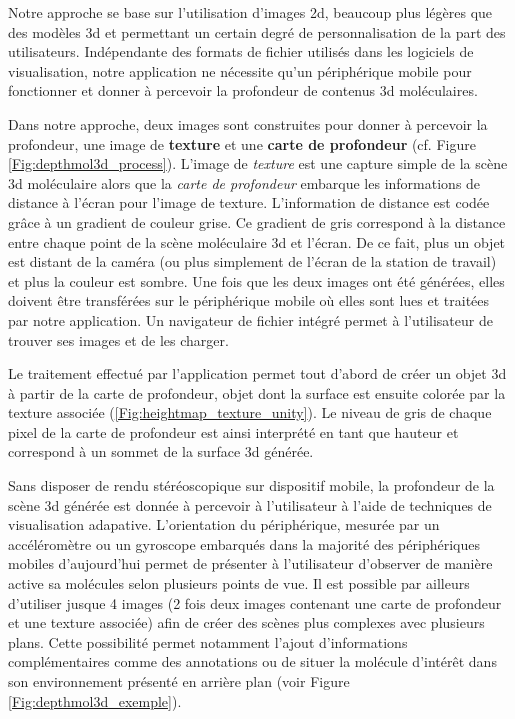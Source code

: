 Notre approche se base sur l'utilisation d'images 2d, beaucoup plus légères que des modèles 3d et permettant un certain degré de personnalisation de la part des utilisateurs. Indépendante des formats de fichier utilisés dans les logiciels de visualisation, notre application ne nécessite qu'un périphérique mobile pour fonctionner et donner à percevoir la profondeur de contenus 3d moléculaires. %

Dans notre approche, deux images sont construites pour donner à percevoir la profondeur, une image de \textbf{texture} et une \textbf{carte de profondeur} (cf. Figure \ref{Fig:depthmol3d_process}). L'image de \textit{texture} est une capture simple de la scène 3d moléculaire alors que la \textit{carte de profondeur} embarque les informations de distance à l'écran pour l'image de texture. L'information de distance est codée grâce à un gradient de couleur grise. Ce gradient de gris correspond à la distance entre chaque point de la scène moléculaire 3d et l'écran. De ce fait, plus un objet est distant de la caméra (ou plus simplement de l'écran de la station de travail) et plus la couleur est sombre. Une fois que les deux images ont été générées, elles doivent être transférées sur le périphérique mobile où elles sont lues et traitées par notre application. Un navigateur de fichier intégré permet à l'utilisateur de trouver ses images et de les charger. 

Le traitement effectué par l'application permet tout d'abord de créer un objet 3d à partir de la carte de profondeur, objet dont la surface est ensuite colorée par la texture associée (\ref{Fig:heightmap_texture_unity}). Le niveau de gris de chaque pixel de la carte de profondeur est ainsi interprété en tant que hauteur et correspond à un sommet de la surface 3d générée. %

Sans disposer de rendu stéréoscopique sur dispositif mobile, la profondeur de la scène 3d générée est donnée à percevoir à l'utilisateur à l'aide de techniques de visualisation adapative.  L'orientation du périphérique, mesurée par un accéléromètre ou un gyroscope embarqués dans la majorité des périphériques mobiles d'aujourd'hui permet de présenter à l'utilisateur d'observer de manière active sa molécules selon plusieurs points de vue. Il est possible par ailleurs d'utiliser jusque 4 images (2 fois deux images contenant une carte de profondeur et une texture associée) afin de créer des scènes plus complexes avec plusieurs plans. Cette possibilité permet notamment l'ajout d'informations complémentaires comme des annotations ou de situer la molécule d'intérêt dans son environnement présenté en arrière plan (voir Figure \ref{Fig:depthmol3d_exemple}).

